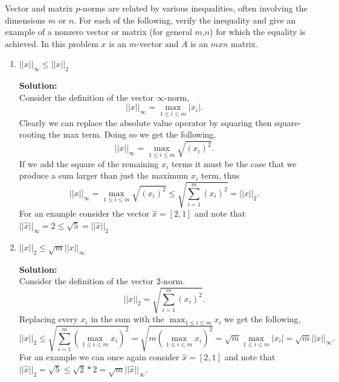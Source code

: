 \documentclass[12pt]{article}
\makeatletter
\theoremstyle{homework}
\newenvironment{exercise}[1]
{\def\@currentlabel{#1}\exercisecore}
{\endexercisecore}
\newcommand{\localhead}[1]{\par\smallskip\noindent\textbf{#1}\nobreak\\}%
\newcommand\solution{\localhead{Solution:}}
\makeatother
\begin{document}
\begin{exercise}{3.3} Vector and matrix $p$-norms are related by various inequalities, often involving
  the dimensions $m$ or $n$. For each of the following, verify the inequality and give an example of a 
  nonzero vector or matrix (for general $m$,$n$) for which the equality is achieved. 
  In this problem $x$ is an $m$-vector and $A$ is an $mxn$ matrix.\\
  \begin{enumerate}
    \item $||x||_{\infty} \leq ||x||_2$\\
    \solution Consider the definition of the vector $\infty$-norm, 
    \begin{equation*}
      ||x||_{\infty} = \max_{1 \leq i \leq m} |x_i|.
    \end{equation*}
    Clearly we can replace the absolute value operator by squaring then square-rooting the max term. 
    Doing so we get the following, 
      \begin{equation*}
        ||x||_{\infty} = \max_{1 \leq i \leq m} \sqrt{(x_i)^2}.
      \end{equation*}
      If we add the square of the remaining $x_i$ terms it must be the case that we produce a sum larger 
      than just the maximum $x_i$ term, thus
      \begin{equation*}
        ||x||_{\infty} = \max_{1 \leq i \leq m} \sqrt{(x_i)^2} \leq \sqrt{\sum_{i=1}^m (x_i)^2} = ||x||_2.
      \end{equation*}
      For an example consider the vector $\hat{x} = [2, 1]$ and note that $||\hat{x}||_{\infty} = 2 \leq \sqrt{5} = ||\hat{x}||_{2}$
    \vspace{.15in}



    \item $||x||_{2} \leq \sqrt{m}||x||_{\infty}$\\
    \solution Consider the definition of the vector $2$-norm. 
    \begin{equation*}
      ||x||_2 = \sqrt{\sum_{i=1}^m (x_i)^2}.
    \end{equation*}
    Replacing every $x_i$ in the sum with the $\max_{1 \leq i \leq m} x_i$ we get the following, 
    \begin{equation*}
      ||x||_{2} \leq \sqrt{\sum_{i=1}^m (\max_{1 \leq i \leq m} x_i)^2} = \sqrt{m(\max_{1 \leq i \leq m} x_i)^2} = \sqrt{m} \max_{1 \leq i \leq m}|x_i| = \sqrt{m}||x||_{\infty}.
    \end{equation*}
    For an example we can once again consider $\hat{x} = [2, 1]$ and note that $||\hat{x}||_{2} = \sqrt{5} \leq \sqrt{2}*2 = \sqrt{m}||\hat{x}||_{\infty}$.
    \vspace{.15in}
  \end{enumerate}
  
\end{exercise}
\vspace{.25in}
\end{document}
